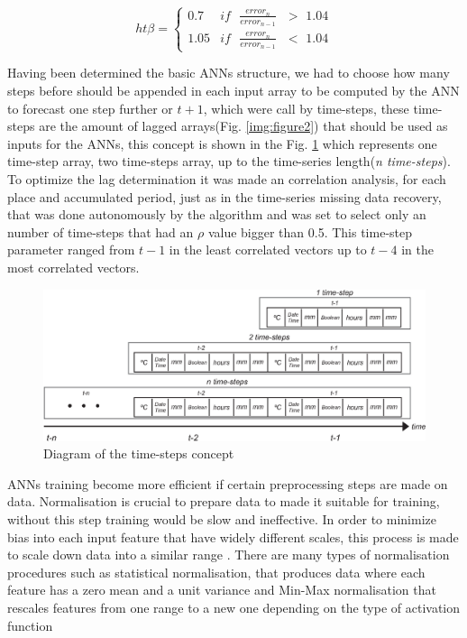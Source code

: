 \begin{equation}
\label{eq:solve18}ht
\beta = \begin{cases}
         0.7 & \text{$if$ $\frac{error_n}{error_{n-1}}$ $>$ 1.04}\\
         1.05 & \text{$if$ $\frac{error_n}{error_{n-1}}$ $<$ 1.04}
        \end{cases}
\end{equation}

Having been determined the basic ANNs structure, we had to choose how many steps before should be appended in each input array to be computed by the ANN to forecast one step further or $t + 1$,
which were call by time-steps, these time-steps are the amount of lagged arrays(Fig. \ref{img:figure2}) that should be used as inputs for the ANNs, this concept is shown in the Fig. \ref{img:figure3} which represents one time-step array,  two time-steps array, up to the time-series length(\textit{n time-steps}). To optimize the lag determination it was made an correlation analysis, for each place and accumulated period, just as in the time-series missing data recovery, that was done autonomously by the algorithm and was set to select only an number of time-steps that had an $\rho$  value bigger than 0.5. This time-step parameter ranged from $t-1$ in the least correlated vectors up to $t-4$ in the most correlated vectors.

\begin{figure}[htb!]
 \centering
 \includegraphics[scale=0.88]{capitulo_2/time_steps}
 \caption{Diagram of the time-steps concept }
 \label{img:figure3}
\end{figure}

\newpage

ANNs training become more efficient if certain preprocessing steps are made on data. Normalisation is crucial to prepare data to made it suitable for training, without this step training would be slow and ineffective. In order to minimize bias into each input feature that have widely different scales, this process is made to scale down data into a similar range \cite{yaldi2009improving}. There are many types of normalisation procedures such as statistical normalisation, that produces data where each feature has a zero mean and a unit variance and Min-Max normalisation that rescales features from one range to a new one depending on the type of activation function    

